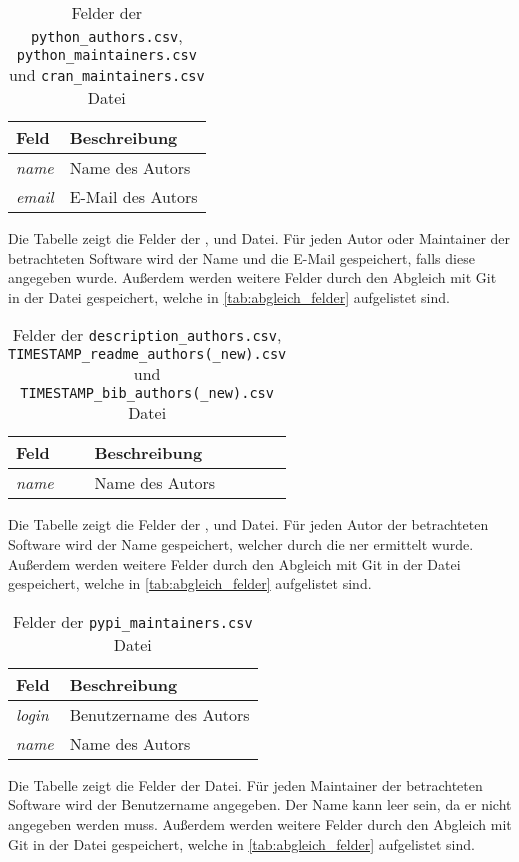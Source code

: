 \begin{table}
    \begin{tabularx}{\textwidth}{XL{10.2cm}}
        \toprule
        \textbf{Feld} & \textbf{Beschreibung} \\ \midrule
        \emph{name}   & Name des Autors       \\
        \emph{email}  & E-Mail des Autors     \\
        \bottomrule
    \end{tabularx}
    \caption{Felder der \texttt{python\_authors.csv}, \texttt{python\_maintainers.csv} und \texttt{cran\_maintainers.csv} Datei}
    \label{tab:python_authors}
    \small
    Die Tabelle zeigt die Felder der ,  und  Datei. Für jeden Autor oder Maintainer der betrachteten Software wird der Name und die E-Mail gespeichert, falls diese angegeben wurde. Außerdem werden weitere Felder durch den Abgleich mit Git in der Datei gespeichert, welche in \autoref{tab:abgleich_felder} aufgelistet sind.
\end{table}

\begin{table}
    \begin{tabularx}{\textwidth}{XL{10.2cm}}
        \toprule
        \textbf{Feld} & \textbf{Beschreibung} \\ \midrule
        \emph{name}   & Name des Autors       \\
        \bottomrule
    \end{tabularx}
    \caption{Felder der \texttt{description\_authors.csv}, \texttt{TIMESTAMP\_readme\_authors(\_new).csv} und \texttt{TIMESTAMP\_bib\_authors(\_new).csv} Datei}
    \label{tab:description_authors}
    \small
    Die Tabelle zeigt die Felder der ,  und  Datei. Für jeden Autor der betrachteten Software wird der Name gespeichert, welcher durch die \gls{ner} ermittelt wurde. Außerdem werden weitere Felder durch den Abgleich mit Git in der Datei gespeichert, welche in \autoref{tab:abgleich_felder} aufgelistet sind.
\end{table}

\begin{table}
    \begin{tabularx}{\textwidth}{XL{10.2cm}}
        \toprule
        \textbf{Feld} & \textbf{Beschreibung}   \\ \midrule
        \emph{login}  & Benutzername des Autors \\
        \emph{name}   & Name des Autors         \\
        \bottomrule
    \end{tabularx}
    \caption{Felder der \texttt{pypi\_maintainers.csv} Datei}
    \label{tab:pypi_maintainers}
    \small
    Die Tabelle zeigt die Felder der  Datei. Für jeden Maintainer der betrachteten Software wird der Benutzername angegeben. Der Name kann leer sein, da er nicht angegeben werden muss. Außerdem werden weitere Felder durch den Abgleich mit Git in der Datei gespeichert, welche in \autoref{tab:abgleich_felder} aufgelistet sind.
\end{table}
